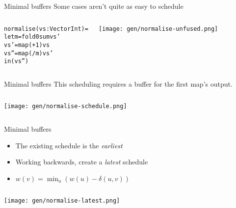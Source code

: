 \documentclass{beamer}
\newcommand{\bl}[1]{\textcolor[rgb]{0.0,0.5,0.9}{#1}}
\newcommand{\g}[1]{\textcolor[rgb]{0.7,0.3,0.3}{#1}}
\begin{document}
\begin{frame}[fragile,b]{Minimal buffers}
Some cases aren't quite as easy to schedule

\begin{columns}
\column[t]{5cm}

\begin{alltt}
normalise (\bl{vs} : Vector Int) =
 let m   = \g{fold}     0 sum vs'
     vs' = \g{map}    (+1)    vs
     vs''= \g{map}    (/m)    vs'
 in (\bl{vs''})
\end{alltt}

\column[t]{5cm}

\texttt{[image: gen/normalise-unfused.png]}

\end{columns}
\end{frame}

\begin{frame}[fragile,b]{Minimal buffers}
This scheduling requires a buffer for the first map's output.

\begin{columns}
\column[t]{5cm}

\column[t]{5cm}

\texttt{[image: gen/normalise-schedule.png]}

\end{columns}
\end{frame}


\begin{frame}[fragile,b]{Minimal buffers}

\begin{itemize}
\item The existing schedule is the \emph{earliest}
\item Working backwards, create a \emph{latest} schedule
\item $w(v) = \min_u (w(u) - \delta(u,v))$
\end{itemize}

\begin{columns}
\column[t]{5cm}

\column[t]{5cm}

\texttt{[image: gen/normalise-latest.png]}

\end{columns}
\end{frame}
\end{document}
